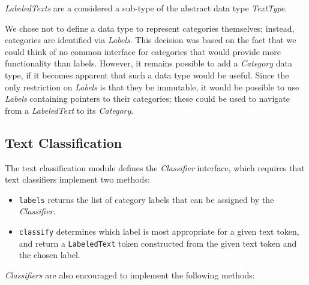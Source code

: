 \documentclass[12pt]{article}
\begin{document}
    \noindent
    \textit{LabeledTexts} are a considered a sub-type of the abstract
    data type \textit{TextType}.

    We chose not to define a data type to represent categories
    themselves; instead, categories are identified via
    \textit{Labels}.  This decision was based on the fact that we
    could think of no common interface for categories that would
    provide more functionality than labels.  However, it remains
    possible to add a \textit{Category} data type, if it becomes
    apparent that such a data type would be useful.  Since the only
    restriction on \textit{Labels} is that they be immutable, it would
    be possible to use \textit{Labels} containing pointers to their
    categories; these could be used to navigate from a
    \textit{LabeledText} to its \textit{Category}.

  \subsection{Text Classification}

    The text classification module defines the \textit{Classifier}
    interface, which requires that text classifiers implement two
    methods:

    \begin{itemize}

      \item \texttt{labels} returns the list of category labels that
      can be assigned by the \textit{Classifier}.

      \item \texttt{classify} determines which label is most
      appropriate for a given text token, and return a
      \texttt{LabeledText} token constructed from the given text token
      and the chosen label.

    \end{itemize}

    \noindent
    \textit{Classifiers} are also encouraged to implement the
    following methods:
\end{document}
